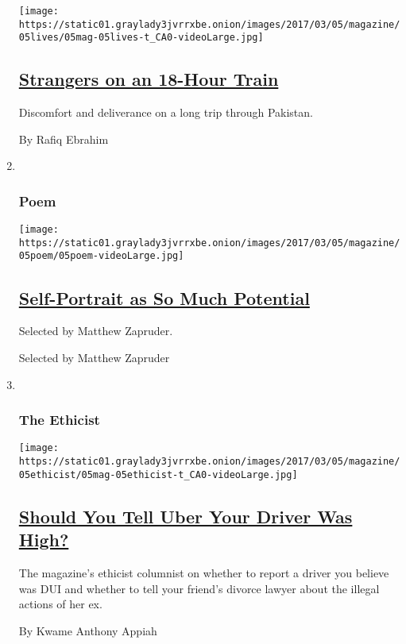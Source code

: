 \begin{enumerate}
  \texttt{[image: https://static01.graylady3jvrrxbe.onion/images/2017/03/05/magazine/05lives/05mag-05lives-t\_CA0-videoLarge.jpg]}

  \hypertarget{strangers-on-an-18-hour-train}{%
  \subsection{\texorpdfstring{\href{/2017/03/03/magazine/strangers-on-an-18-hour-train.html}{Strangers
  on an 18-Hour
  Train}}{Strangers on an 18-Hour Train}}\label{strangers-on-an-18-hour-train}}

  Discomfort and deliverance on a long trip through Pakistan.

  By Rafiq Ebrahim
\item ~
  \hypertarget{poem}{%
  \subsubsection{Poem}\label{poem}}

  \texttt{[image: https://static01.graylady3jvrrxbe.onion/images/2017/03/05/magazine/05poem/05poem-videoLarge.jpg]}

  \hypertarget{self-portrait-as-so-much-potential}{%
  \subsection{\texorpdfstring{\href{/2017/03/03/magazine/self-portrait-as-so-much-potential.html}{Self-Portrait
  as So Much
  Potential}}{Self-Portrait as So Much Potential}}\label{self-portrait-as-so-much-potential}}

  Selected by Matthew Zapruder.

  Selected by Matthew Zapruder
\item ~
  \hypertarget{the-ethicist}{%
  \subsubsection{The Ethicist}\label{the-ethicist}}

  \texttt{[image: https://static01.graylady3jvrrxbe.onion/images/2017/03/05/magazine/05ethicist/05mag-05ethicist-t\_CA0-videoLarge.jpg]}

  \hypertarget{should-you-tell-uber-your-driver-was-high}{%
  \subsection{\texorpdfstring{\href{/2017/03/01/magazine/should-you-tell-uber-your-driver-was-high.html}{Should
  You Tell Uber Your Driver Was
  High?}}{Should You Tell Uber Your Driver Was High?}}\label{should-you-tell-uber-your-driver-was-high}}

  The magazine's ethicist columnist on whether to report a driver you
  believe was DUI and whether to tell your friend's divorce lawyer about
  the illegal actions of her ex.

  By Kwame Anthony Appiah
\end{enumerate}

